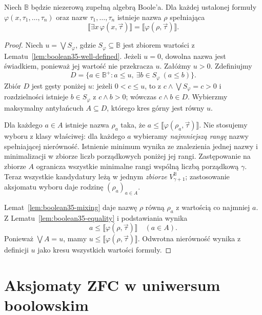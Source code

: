 \begin{twierdzenie}
\label{thm:boolean35-fullness}
Niech $\mathbb B$ będzie niezerową
zupełną algebrą Boole'a.
Dla każdej ustalonej formuły
$\varphi(x,\tau_1,\ldots,\tau_n)$
oraz nazw $\tau_1,\ldots,\tau_n$
istnieje nazwa $\rho$ spełniająca
\[
 \llbracket\exists x\,\varphi(x,\vec\tau)\rrbracket
   =\llbracket\varphi(\rho,\vec\tau)\rrbracket.
\]
\end{twierdzenie}
\begin{proof}
Niech $u=\bigvee S_\varphi$, gdzie
$S_\varphi\subseteq\mathbb B$
jest zbiorem wartości
z Lematu~\ref{lem:boolean35-well-defined}.
Jeżeli $u=0$, dowolna nazwa
jest świadkiem, ponieważ jej wartość
nie przekracza $u$. Załóżmy $u>0$.
Zdefiniujmy
\[
 D=\{a\in\mathbb B^+:
    a\le u,\ \exists b\in S_\varphi\ (a\le b)\}.
\]
Zbiór $D$ jest gęsty poniżej $u$:
jeżeli $0<c\le u$, to z
$c\wedge\bigvee S_\varphi=c>0$
i rozdzielności istnieje
$b\in S_\varphi$ z $c\wedge b>0$;
wówczas $c\wedge b\in D$.
Wybierzmy maksymalny antyłańcuch
$A\subseteq D$, którego kres górny
jest równy $u$.

Dla każdego $a\in A$ istnieje
nazwa $\rho_a$ taka, że
$a\le\llbracket\varphi(\rho_a,\vec\tau)
\rrbracket$. Nie stosujemy wyboru
z klasy właściwej: dla każdego $a$
wybieramy \emph{najmniejszą rangę}
nazwy spełniającej nierówność.
Istnienie minimum wynika ze
znalezienia jednej nazwy i
minimalizacji w zbiorze liczb
porządkowych poniżej jej rangi.
Zastępowanie na zbiorze $A$
ogranicza wszystkie minimalne
rangi wspólną liczbą porządkową
$\gamma$. Teraz wszystkie
kandydatury leżą w jednym
\emph{zbiorze} $V_{\gamma+1}^{\mathbb B}$;
zastosowanie aksjomatu wyboru
daje rodzinę $(\rho_a)_{a\in A}$.

Lemat~\ref{lem:boolean35-mixing}
daje nazwę $\rho$ równą $\rho_a$
z wartością co najmniej $a$.
Z Lematu~\ref{lem:boolean35-equality}
i podstawiania wynika
\[
 a\le\llbracket\varphi(\rho,\vec\tau)\rrbracket
 \quad(a\in A).
\]
Ponieważ $\bigvee A=u$,
mamy $u\le\llbracket\varphi(\rho,\vec\tau)
\rrbracket$. Odwrotna nierówność
wynika z definicji $u$ jako kresu
wszystkich wartości formuły.
\end{proof}

\section{Aksjomaty ZFC w uniwersum boolowskim}

